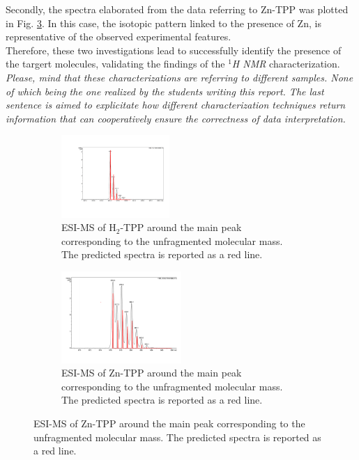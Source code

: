 \documentclass[num-refs]{wiley-article}
\begin{document}
Secondly, the spectra elaborated from the data referring to Zn-TPP was plotted in Fig. \ref{ESI-MS-Zn-TPP}.
In this case, the isotopic pattern linked to the presence of Zn, is representative of the observed experimental features.\\
Therefore, these two investigations lead to successfully identify the presence of the targert molecules, validating the findings of the \textit{$^{1}$H NMR} characterization.
\textit{Please, mind that these characterizations are referring to different samples. None of which being the one realized by the students writing this report. The last sentence is aimed to explicitate how different characterization techniques return information that can cooperatively ensure the correctness of data interpretation.}
\begin{figure}
    \centering
    \begin{subfigure}
        \centering
        \includegraphics[width=0.45\textwidth]{ESI-MS-H2-TPP}
        \caption{ESI-MS of H$_{2}$-TPP around the main peak corresponding to the unfragmented molecular mass. The predicted spectra is reported as a red line.}
        \label{ESI-MS-H2-TPP}
    \end{subfigure}
    \begin{subfigure}
        \centering
        \includegraphics[width=0.5\textwidth]{ESI-MS-Zn-TPP}
        \caption{ESI-MS of Zn-TPP around the main peak corresponding to the unfragmented molecular mass. The predicted spectra is reported as a red line.}
        \label{ESI-MS-Zn-TPP}
    \end{subfigure}
\end{figure}
\end{document}
